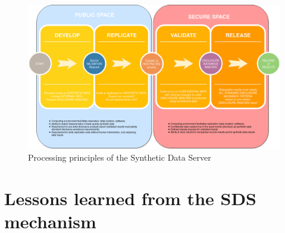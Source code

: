 \documentclass[]{hdsr}
\begin{document}
\begin{figure}
    \centering
    \includegraphics[width=\textwidth]{figs/SyntheticDataCycle.png}
    \caption{Processing principles of the Synthetic Data Server}
    \label{fig:data-cycle.png}
\end{figure}


\restoregeometry
{}


\section{Lessons learned from the SDS mechanism}
\end{document}
